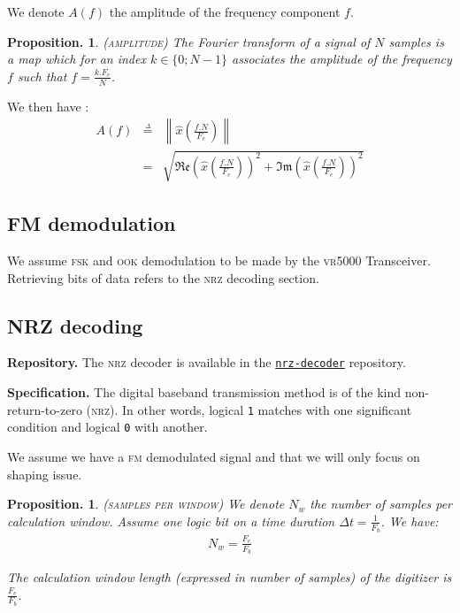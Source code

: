 \documentclass[twocolumn,pre,floats,aps,amsmath,amssymb]{revtex4}
\newtheorem{proposition}[theorem]{Proposition.}
\begin{document}
We denote $A (f)$ the amplitude of the frequency component $f$.

\begin{proposition}
\textsc{(amplitude)}
The Fourier transform of a signal of $N$ samples is a map which for an index $k \in \{0 ; N - 1\}$ associates the amplitude of the frequency $f$ such that $f = \frac{k.F_e}{N}$.
\end{proposition}

We then have\cite{Senlis} :
\begin{eqnarray*}
  A (f) &\overset{\underset{\Delta}{}}{=}& \left \| \hat{x} \left (\frac{f.N}{F_e} \right ) \right \|\\
        &=& \sqrt{\mathfrak{Re} \left ( \hat{x} \left (\frac{f.N}{F_e} \right ) \right )^2 + \mathfrak{Im} \left ( \hat{x} \left (\frac{f.N}{F_e} \right ) \right )^2}
\end{eqnarray*}

\subsection{FM demodulation}

We assume \textsc{fsk} and \textsc{ook} demodulation to be made by the \textsc{vr5000} Transceiver. Retrieving bits of data refers to the \textsc{nrz} decoding section.

\subsection{NRZ decoding}

\noindent
\textbf{Repository.} The \textsc{nrz} decoder is available in the \href{https://github.com/EmptyStackExn/nrz-decoder}{\texttt{nrz-decoder}} repository.

\noindent
\textbf{Specification.}
  The digital baseband transmission method is of the kind non-return-to-zero (\textsc{nrz}). In other words, logical \texttt{1} matches with one significant condition and logical \texttt{0} with another.

We assume we have a \textsc{fm} demodulated signal and that we will only focus on shaping issue.

\begin{proposition}
  \textsc{(samples per window)}
  We denote $N_w$ the number of samples per calculation window. Assume one logic bit on a time duration $\Delta t = \frac{1}{F_b}$. We have:
  \begin{eqnarray}
    N_w = \frac{F_e}{F_b}
  \end{eqnarray}

  The calculation window length (expressed in number of samples) of the digitizer is $\frac{F_e}{F_b}$.
\end{proposition}
\end{document}
